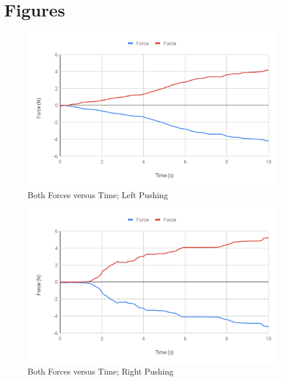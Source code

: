 \section{Figures}
\begin{figure}[ht]
    \centering
    \includegraphics[scale=0.71]{image/05-third-law/Run-13-Both.png}
    \caption{Both Forces versus Time; Left Pushing}
    \label{figure:05.ff.L}
\end{figure}
\begin{figure}[ht]
    \centering
    \includegraphics[scale=0.71]{image/05-third-law/Run-14-Both.png}
    \caption{Both Forces versus Time; Right Pushing}
    \label{figure:05.ff.R}
\end{figure}
